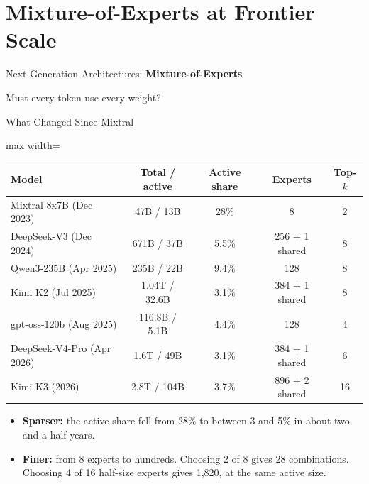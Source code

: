 \section{Mixture-of-Experts at Frontier Scale}

\begin{frame}{}
    \LARGE Next-Generation Architectures: \textbf{Mixture-of-Experts}

    \vspace{1em}
    \normalsize Must every token use every weight?
\end{frame}

\begin{frame}{What Changed Since Mixtral}
    \begin{center}
    \small
    \renewcommand{\arraystretch}{1.15}
    \begin{adjustbox}{max width=\linewidth}\begin{tabular}{lcccc}
        \toprule
        \textbf{Model} & \textbf{Total / active} & \textbf{Active share} & \textbf{Experts} & \textbf{Top-$k$} \\
        \midrule
        Mixtral 8x7B (Dec 2023) & 47B / 13B & 28\% & 8 & 2 \\
        DeepSeek-V3 (Dec 2024) & 671B / 37B & 5.5\% & 256 + 1 shared & 8 \\
        Qwen3-235B (Apr 2025) & 235B / 22B & 9.4\% & 128 & 8 \\
        Kimi K2 (Jul 2025) & 1.04T / 32.6B & 3.1\% & 384 + 1 shared & 8 \\
        gpt-oss-120b (Aug 2025) & 116.8B / 5.1B & 4.4\% & 128 & 4 \\
        DeepSeek-V4-Pro (Apr 2026) & 1.6T / 49B & 3.1\% & 384 + 1 shared & 6 \\
        \rowcolor{KAUSTcyan!12} Kimi K3 (2026) & 2.8T / 104B & 3.7\% & 896 + 2 shared & 16 \\
        \bottomrule
    \end{tabular}\end{adjustbox}
    \end{center}
    \begin{itemize}\itemsep0.35em
        \item \textbf{Sparser:} the active share fell from 28\% to between 3 and 5\% in about two and a half years.
        \item \textbf{Finer:} from 8 experts to hundreds. Choosing 2 of 8 gives 28 combinations. Choosing 4 of 16 half-size experts gives 1,820, at the same active size.
    \end{itemize}
\end{frame}

